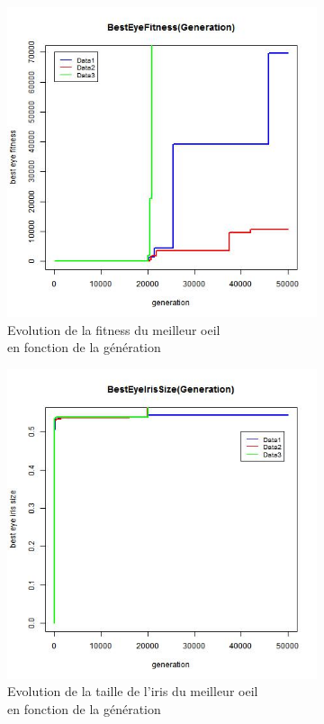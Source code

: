 \documentclass[a4paper,11pt]{article}
\begin{document}
\begin{figure}
\centering
\begin{subfigure}{.5\textwidth}
  \centering
\includegraphics[width=1\linewidth]{best_eye_fitness.jpeg}
\caption{Evolution de la fitness du meilleur oeil \\en fonction de la génération}
\label{fig:modelisation}
\end{subfigure}%
\begin{subfigure}{.5\textwidth}
  \centering
\includegraphics[width=1\linewidth]{best_eye_iris_size.jpeg}
\caption{Evolution de la taille de l'iris du meilleur oeil \\en fonction de la génération}
\label{fig:modelisation}
\end{subfigure}
\caption{}
\label{fig:test}
\end{figure}
\end{document}
